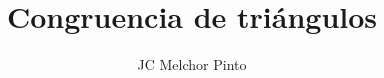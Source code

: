 \documentclass[12pt,addpoints,answers]{guia}
\title{Congruencia de triángulos}
\author{JC Melchor Pinto}
\begin{document}
\pagestyle{headandfoot}
\INFO
\begin{multicols}{2}
    
    
    \columnbreak
    
\end{multicols}



\begin{questions}
    \questionboxed[10]{}
    \questionboxed[10]{}
    \questionboxed[10]{}
    \questionboxed[10]{}
    \questionboxed[10]{}
    \questionboxed[10]{}
    \questionboxed[10]{}
    \questionboxed[10]{}
    \questionboxed[10]{}
    \questionboxed[10]{}
\end{questions}
\end{document}
